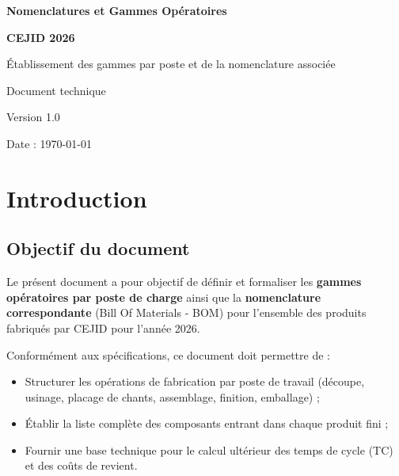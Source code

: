 \documentclass[12pt,a4paper]{article}
\begin{document}
\begin{titlepage}
    \centering
    \vspace*{2cm}
    {\Huge\bfseries Nomenclatures et Gammes Opératoires\par}
    \vspace{0.5cm}
    {\Large\bfseries CEJID 2026\par}
    \vspace{1cm}
    {\large Établissement des gammes par poste et de la nomenclature associée\par}
    \vspace{2cm}
    {\large Document technique\par}
    \vspace{1cm}
    {\large Version 1.0\par}
    \vspace{2cm}
    {\large Date : \today\par}
\end{titlepage}

\tableofcontents
\newpage


\section{Introduction}

\subsection{Objectif du document}
Le présent document a pour objectif de définir et formaliser les \textbf{gammes opératoires par poste de charge} ainsi que la \textbf{nomenclature correspondante} (Bill Of Materials - BOM) pour l'ensemble des produits fabriqués par CEJID pour l'année 2026.

Conformément aux spécifications, ce document doit permettre de :
\begin{itemize}
    \item Structurer les opérations de fabrication par poste de travail (découpe, usinage, placage de chants, assemblage, finition, emballage) ;
    \item Établir la liste complète des composants entrant dans chaque produit fini ;
    \item Fournir une base technique pour le calcul ultérieur des temps de cycle (TC) et des coûts de revient.
\end{itemize}
\end{document}
